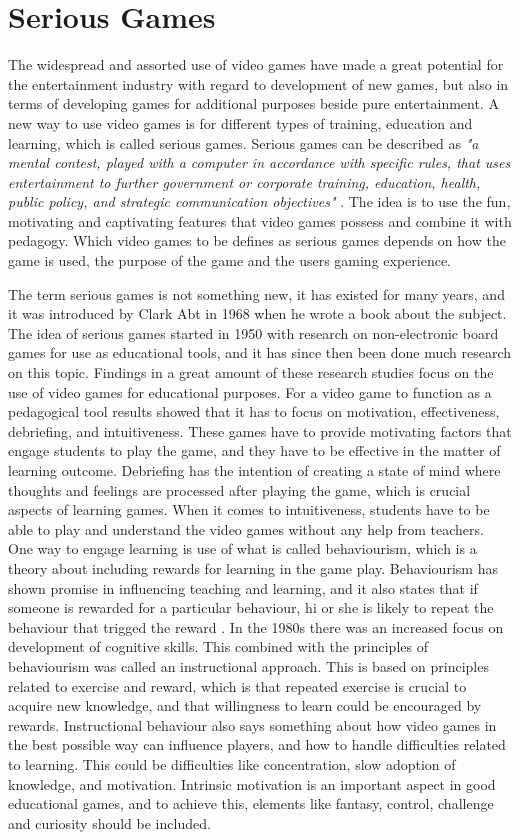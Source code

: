 \section{Serious Games}
The widespread and assorted use of video games have made a great potential for the entertainment industry with regard to development of new games, but also in terms of developing games for additional purposes beside pure entertainment. A new way to use video games is for different types of training, education and learning, which is called serious games. Serious games can be described as \emph{"a mental contest, played with a computer in accordance with specific rules, that uses entertainment to further government or corporate training, education, health, public policy, and strategic communication objectives"} \cite{zyda2005visual}. The idea is to use the fun, motivating and captivating features that video games possess and combine it with pedagogy. Which video games to be defines as serious games depends on how the game is used, the purpose of the game and the users gaming experience. 

The term serious games is not something new, it has existed for many years, and it was introduced by Clark Abt in 1968 when he wrote a book about the subject. The idea of serious games started in 1950 with research on non-electronic board games for use as educational tools, and it has since then been done much research on this topic. Findings in a great amount of these research studies focus on the use of video games for educational purposes. For a video game to function as a pedagogical tool results showed that it has to focus on motivation, effectiveness, debriefing, and intuitiveness. These games have to provide motivating factors that engage students to play the game, and they have to be effective in the matter of learning outcome. Debriefing has the intention of creating a state of mind where thoughts and feelings are processed after playing the game, which is crucial aspects of learning games. When it comes to intuitiveness, students have to be able to play and understand the video games without any help from teachers. One way to engage learning is use of what is called behaviourism, which is a theory about including rewards for learning in the game play. Behaviourism has shown promise in influencing teaching and learning, and it also states that if someone is rewarded for a particular behaviour, hi or she is likely to repeat the behaviour that trigged the reward \cite{behaviour}. In the 1980s there was an increased focus on development of cognitive skills. This combined with the principles of behaviourism was called an instructional approach. This is based on principles related to exercise and reward, which is that repeated exercise is crucial to acquire new knowledge, and that willingness to learn could be encouraged by rewards. Instructional behaviour also says something about how video games in the best possible way can influence players, and how to handle difficulties related to learning. This could be difficulties like concentration, slow adoption of knowledge, and motivation. Intrinsic motivation is an important aspect in good educational games, and to achieve this, elements like fantasy, control, challenge and curiosity should be included. 

